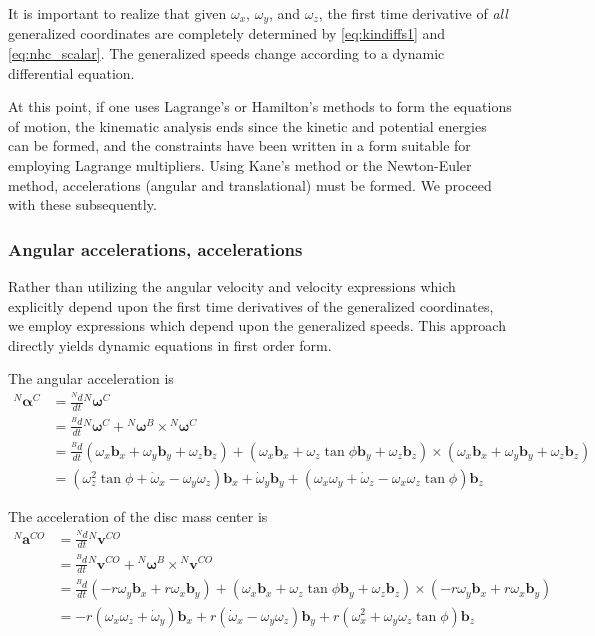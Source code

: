\documentclass[letterpaper,11pt]{article}
\newcommand{\bs}[1]{\boldsymbol{#1}}
\begin{document}
It is important to realize that given $\omega_x$, $\omega_y$, and $\omega_z$,
the first time derivative of \textit{all} generalized coordinates are
completely determined by \ref{eq:kindiffs1} and \ref{eq:nhc_scalar}.  The
generalized speeds change according to a dynamic differential equation.

At this point, if one uses Lagrange's or Hamilton's methods to form the
equations of motion, the kinematic analysis ends since the kinetic and
potential energies can be formed, and the constraints have been written in a
form suitable for employing Lagrange multipliers.  Using Kane's method or
the Newton-Euler method, accelerations (angular and translational) must be
formed.  We proceed with these subsequently.

\subsubsection{Angular accelerations, accelerations}
Rather than utilizing the angular velocity and velocity expressions which
explicitly depend upon the first time derivatives of the generalized
coordinates, we employ expressions which depend upon the generalized speeds.
This approach directly yields dynamic equations in first order form.

The angular acceleration is
\begin{align}
    {}^N\bs{\alpha}^{C} &= \frac{ {}^Nd}{dt}{}^N\bs{\omega}^C \nonumber \\
    &= \frac{ {}^Bd}{dt} {}^N\bs{\omega}^C + {}^N\bs{\omega}^B \times
    {}^N\bs{\omega}^C
    \nonumber \\
    &= \frac{ {}^Bd}{dt}(\omega_x \bs{b}_x + \omega_y \bs{b}_y +\omega_z
    \bs{b}_z) + (\omega_x \bs{b}_x + \omega_z \tan{\phi} \bs{b}_y + \omega_z
    \bs{b}_z) \times (\omega_x \bs{b}_x + \omega_y \bs{b}_y +\omega_z
    \bs{b}_z) \nonumber \\
    & = (\omega_z^2\tan{\phi} + \dot{\omega}_x- \omega_y\omega_z)\bs{b}_x 
    + \dot{\omega}_y\bs{b}_y + (\omega_x\omega_y +\dot{\omega}_z -
    \omega_x\omega_z\tan{\phi}) \bs{b}_z
  \label{eq:alf}
\end{align}

The acceleration of the disc mass center is
\begin{align}
    {}^N\bs{a}^{CO} &= \frac{ {}^Nd}{dt}{}^N\bs{v}^{CO} \nonumber \\
    &= \frac{ {}^Bd}{dt} {}^N\bs{v}^{CO} + {}^N\bs{\omega}^B \times
    {}^N\bs{v}^{CO}
    \nonumber \\
    &= \frac{ {}^Bd}{dt} (-r \omega_y \bs{b}_x + r \omega_x \bs{b}_y) + (\omega_x \bs{b}_x + \omega_z \tan{\phi} \bs{b}_y + \omega_z
    \bs{b}_z) \times (-r \omega_y \bs{b}_x + r \omega_x \bs{b}_y) \nonumber
    \\
    &= -r (\omega_x\omega_z + \dot{\omega}_y)\bs{b}_x + r (\dot{\omega}_x -
    \omega_y \omega_z)\bs{b}_y + r (\omega_x^2 + \omega_y
    \omega_z\tan{\phi})\bs{b}_z
  \label{eq:aco}
\end{align}
\end{document}
